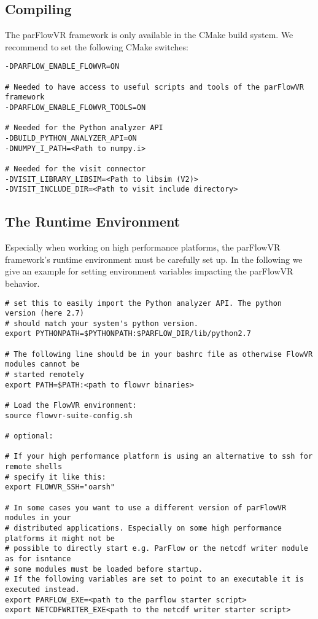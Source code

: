 \subsection{Compiling}
The parFlowVR framework is only available in the CMake build system. We recommend to set the following
CMake switches:
\begin{display}\begin{verbatim}
-DPARFLOW_ENABLE_FLOWVR=ON

# Needed to have access to useful scripts and tools of the parFlowVR framework
-DPARFLOW_ENABLE_FLOWVR_TOOLS=ON

# Needed for the Python analyzer API
-DBUILD_PYTHON_ANALYZER_API=ON
-DNUMPY_I_PATH=<Path to numpy.i>

# Needed for the visit connector
-DVISIT_LIBRARY_LIBSIM=<Path to libsim (V2)>
-DVISIT_INCLUDE_DIR=<Path to visit include directory>
\end{verbatim}\end{display}

\subsection{The Runtime Environment}
Especially when working on high performance platforms, the parFlowVR framework's runtime
environment must be carefully set up.
In the following we give an example for setting environment variables impacting the
parFlowVR behavior.
\begin{display}\begin{verbatim}
# set this to easily import the Python analyzer API. The python version (here 2.7)
# should match your system's python version.
export PYTHONPATH=$PYTHONPATH:$PARFLOW_DIR/lib/python2.7

# The following line should be in your bashrc file as otherwise FlowVR modules cannot be
# started remotely
export PATH=$PATH:<path to flowvr binaries>

# Load the FlowVR environment:
source flowvr-suite-config.sh

# optional:

# If your high performance platform is using an alternative to ssh for remote shells
# specify it like this:
export FLOWVR_SSH="oarsh"

# In some cases you want to use a different version of parFlowVR modules in your
# distributed applications. Especially on some high performance platforms it might not be
# possible to directly start e.g. ParFlow or the netcdf writer module as for isntance
# some modules must be loaded before startup.
# If the following variables are set to point to an executable it is executed instead.
export PARFLOW_EXE=<path to the parflow starter script>
export NETCDFWRITER_EXE<path to the netcdf writer starter script>
\end{verbatim}\end{display}


